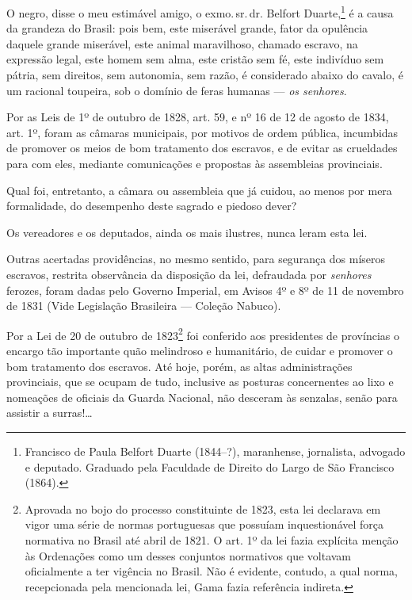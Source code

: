 O negro, disse o meu estimável amigo, o exmo.\,sr.\,dr. Belfort
Duarte,\footnote{Francisco de Paula Belfort Duarte (1844--?),
  maranhense, jornalista, advogado e deputado. Graduado pela Faculdade
  de Direito do Largo de São Francisco (1864).} é a causa da grandeza do
Brasil: pois bem, este miserável grande, fator da opulência daquele
grande miserável, este animal maravilhoso, chamado escravo, na expressão
legal, este homem sem alma, este cristão sem fé, este indivíduo sem
pátria, sem direitos, sem autonomia, sem razão, é considerado abaixo do
cavalo, é um racional toupeira, sob o domínio de feras humanas ---
\emph{os senhores}.

Por as Leis de 1º de outubro de 1828, art. 59, e nº 16 de 12 de agosto
de 1834, art. 1º, foram as câmaras municipais, por motivos de ordem
pública, incumbidas de promover os meios de bom tratamento dos escravos,
e de evitar as crueldades para com eles, mediante comunicações e
propostas às assembleias provinciais.

Qual foi, entretanto, a câmara ou assembleia que já cuidou, ao menos por
mera formalidade, do desempenho deste sagrado e piedoso dever?

Os vereadores e os deputados, ainda os mais ilustres, nunca leram esta
lei.

Outras acertadas providências, no mesmo sentido, para segurança dos
míseros escravos, restrita observância da disposição da lei, defraudada
por \emph{senhores} ferozes, foram dadas pelo Governo Imperial, em
Avisos 4º e 8º de 11 de novembro de 1831 (Vide Legislação
Brasileira --- Coleção Nabuco).

Por a Lei de 20 de outubro de 1823\footnote{Aprovada no bojo do
  processo constituinte de 1823, esta lei declarava em vigor uma série
  de normas portuguesas que possuíam inquestionável força normativa no
  Brasil até abril de 1821. O art. 1º da lei fazia explícita menção às
  Ordenações como um desses conjuntos normativos que voltavam
  oficialmente a ter vigência no Brasil. Não é evidente, contudo, a qual
  norma, recepcionada pela mencionada lei, Gama fazia referência indireta.}
foi conferido aos presidentes de províncias o encargo tão importante
quão melindroso e humanitário, de cuidar e promover o bom tratamento dos
escravos. Até hoje, porém, as altas administrações provinciais, que se
ocupam de tudo, inclusive as posturas concernentes ao lixo e nomeações
de oficiais da Guarda Nacional, não desceram às senzalas, senão para
assistir a surras!\ldots{}

